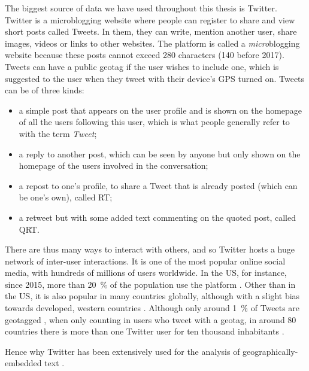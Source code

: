 \documentclass[../thesis.tex]{subfiles}
\begin{document}
The biggest source of data we have used throughout this thesis is Twitter. Twitter is a
microblogging website where people can register to share and view short posts called
Tweets. In them, they can write, mention another user, share images, videos or links to
other websites. The platform is called a \emph{micro}blogging website because these
posts cannot exceed 280 characters (140 before 2017). Tweets
can have a public geotag if the user wishes to include one, which is suggested to the
user when they tweet with their device's GPS turned on. Tweets can be of three kinds:
\begin{itemize}
  \item a simple post that appears on the user profile and is shown on the homepage of
  all the users following this user, which is what people generally refer to with the
  term \emph{Tweet};
  \item a reply to another post, which can be seen by anyone but only shown on the
  homepage of the users involved in the conversation;
  \item a repost to one's profile, to share a Tweet that is already posted (which can be
  one's own), called \ac{RT};
  \item a retweet but with some added text commenting on the quoted post, called
  \ac{QRT}.
\end{itemize}
There are thus many ways to interact with others, and so Twitter hosts a huge network
of inter-user interactions. It is one of the most popular online social media, with
hundreds of millions of users worldwide. In the US, for instance, since 2015, more than
\SI{20}{\percent} of the population use the platform \cite{AuxierSocialMedia2021}. Other
than in the US, it is also popular in many countries globally, although with a slight
bias towards developed, western countries \cite{HawelkaGeolocatedTwitter2014}. Although
only around \SI{1}{\percent} of Tweets are geotagged \cite{MorstatterSampleGood2021},
when only counting in users who tweet with a geotag, in around 80 countries there is more
than one Twitter user for ten thousand inhabitants \cite{MocanuTwitterBabel2013}.

Hence why Twitter has been extensively used for the analysis of geographically-embedded
text \cite{ArthurHumanGeography2019,BokanyiRaceReligion2016,BokanyiScalingWords2019,GoncalvesCrowdsourcingDialect2014,GoncalvesLearningSpanish2016,GoncalvesMappingAmericanization2018, GrieveMappingLexical2019,HuangUnderstandingRegional2016,KoyluUncoveringGeoSocial2018,MocanuTwitterBabel2013,NguyenAudienceUse2015,LamannaImmigrantCommunity2018}.
\end{document}
